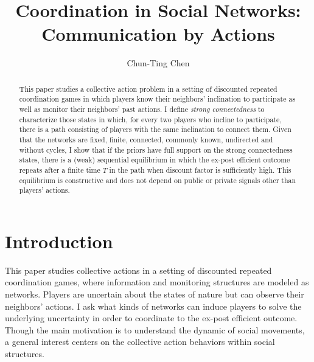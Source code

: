 \documentclass[12pt,letter]{article}
\theoremstyle{definition}
\theoremstyle{remark}
\theoremstyle{claim}
\begin{document}

\title {Coordination in Social Networks: Communication by Actions}
\author {Chun-Ting Chen}

\maketitle

\begin{abstract}

This paper studies a collective action problem in a setting of discounted repeated coordination games in which players know their neighbors'  inclination to participate as well as monitor their neighbors' past actions. I define \textit{strong connectedness} to characterize those states in which, for every two players who incline to participate, there is a path consisting of players with the same inclination to connect them.  Given that the networks are fixed, finite, connected, commonly known, undirected and without cycles, I show that if the priors have full support on the strong connectedness states, there is a (weak) sequential equilibrium in which the ex-post efficient outcome repeats after a finite time $T$ in the path when discount factor is sufficiently high. This equilibrium is constructive and does not depend on public or private signals other than players' actions.




\end{abstract}


\section{Introduction} 

This paper studies collective actions in a setting of discounted repeated coordination games, where information and monitoring structures are modeled as networks. Players are uncertain about the states of nature but can observe their neighbors' actions. I ask what kinds of networks can induce players to solve the underlying uncertainty in order to coordinate to the ex-post efficient outcome. Though the main motivation is to understand the dynamic of social movements, a general interest centers on the collective action behaviors within social structures.
\end{document}
